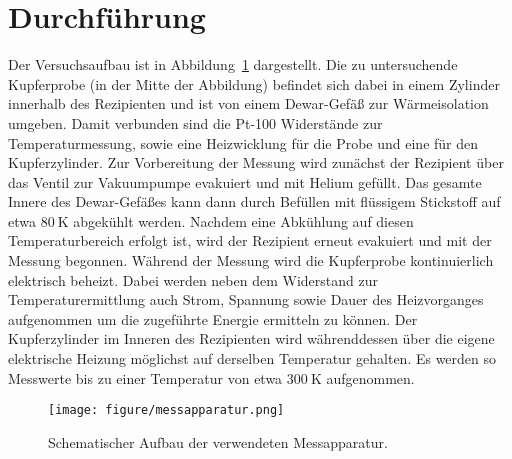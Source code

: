 \section{Durchführung}
\label{sec:durchführung}
%
Der Versuchsaufbau ist in Abbildung~\ref{fig:aufbau} dargestellt. Die zu untersuchende Kupferprobe (in der Mitte der Abbildung) befindet sich dabei in einem Zylinder innerhalb des Rezipienten und ist von einem Dewar-Gefäß zur Wärmeisolation umgeben. Damit verbunden sind die Pt-100 Widerstände zur Temperaturmessung, sowie eine Heizwicklung für die Probe und eine für den Kupferzylinder.
Zur Vorbereitung der Messung wird zunächst der Rezipient über das Ventil zur Vakuumpumpe evakuiert und mit Helium gefüllt. Das gesamte Innere des Dewar-Gefäßes kann dann durch Befüllen mit flüssigem Stickstoff auf etwa $\SI{80}{\kelvin}$ abgekühlt werden. Nachdem eine Abkühlung auf diesen Temperaturbereich erfolgt ist, wird der Rezipient erneut evakuiert und mit der Messung begonnen.
Während der Messung wird die Kupferprobe kontinuierlich elektrisch beheizt. Dabei werden neben dem Widerstand zur Temperaturermittlung auch Strom, Spannung sowie Dauer des Heizvorganges aufgenommen um die zugeführte Energie ermitteln zu können. Der Kupferzylinder im Inneren des Rezipienten wird währenddessen über die eigene elektrische Heizung möglichst auf derselben Temperatur gehalten. Es werden so Messwerte bis zu einer Temperatur von etwa $\SI{300}{\kelvin}$ aufgenommen.

\begin{figure}
    \centering
    \texttt{[image: figure/messapparatur.png]}
    \caption{Schematischer Aufbau der verwendeten Messapparatur.\cite{V47}}
    \label{fig:aufbau}
\end{figure}

